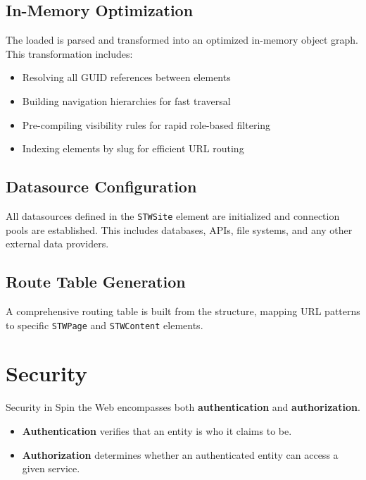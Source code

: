 \subsection{In-Memory Optimization}

The loaded \webbase{} is parsed and transformed into an optimized in-memory object graph. This transformation includes:

\begin{itemize}
	\item Resolving all GUID references between elements
	\item Building navigation hierarchies for fast traversal
	\item Pre-compiling visibility rules for rapid role-based filtering
	\item Indexing elements by slug for efficient URL routing
\end{itemize}

\subsection{Datasource Configuration}

All datasources defined in the \texttt{STWSite} element are initialized and connection pools are established. This includes databases, \rest{} APIs, file systems, and any other external data providers.

\subsection{Route Table Generation}

A comprehensive routing table is built from the \webbase{} structure, mapping URL patterns to specific \texttt{STWPage} and \texttt{STWContent} elements.

\section{Security}
\label{sec:security}

Security in Spin the Web encompasses both \textbf{authentication} and \textbf{authorization}.

\begin{itemize}
	\item \textbf{Authentication} verifies that an entity is who it claims to be.
	\item \textbf{Authorization} determines whether an authenticated entity can access a given service.
\end{itemize}

